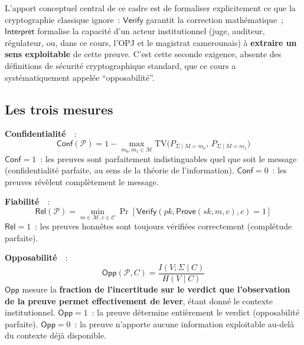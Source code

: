 L'apport conceptuel central de ce cadre est de formaliser
explicitement ce que la cryptographie classique ignore~:
$\mathsf{Verify}$ garantit la correction mathématique~;
$\mathsf{Interpret}$ formalise la capacité d'un acteur institutionnel
(juge, auditeur, régulateur, ou, dans ce cours, l'OPJ et le
magistrat camerounais) à \textbf{extraire un sens exploitable} de
cette preuve. C'est cette seconde exigence, absente des définitions
de sécurité cryptographique standard, que ce cours a systématiquement
appelée ``opposabilité''.

\subsection{Les trois mesures}

\begin{boxdef}
\textbf{Confidentialité}~\cite{minka2026clo}~:
\begin{equation}
\mathsf{Conf}(\mathcal{P}) = 1 - \max_{m_0,m_1 \in \mathcal{M}}
\mathrm{TV}\bigl(P_{\Sigma \mid M=m_0},\, P_{\Sigma \mid M=m_1}\bigr)
\label{eq:conf}
\end{equation}
$\mathsf{Conf} = 1$~: les preuves sont parfaitement indistinguables
quel que soit le message (confidentialité parfaite, au sens de la
théorie de l'information). $\mathsf{Conf} = 0$~: les preuves
révèlent complètement le message.

\textbf{Fiabilité}~\cite{minka2026clo}~:
\begin{equation}
\mathsf{Rel}(\mathcal{P}) = \min_{m \in \mathcal{M}, c \in \mathcal{C}}
\Pr[\mathsf{Verify}(pk, \mathsf{Prove}(sk,m,c), c) = 1]
\label{eq:rel}
\end{equation}
$\mathsf{Rel} = 1$~: les preuves honnêtes sont toujours vérifiées
correctement (complétude parfaite).

\textbf{Opposabilité}~\cite{minka2026clo}~:
\begin{equation}
\mathsf{Opp}(\mathcal{P}, C) = \frac{I(V; \Sigma \mid C)}{H(V \mid C)}
\label{eq:opp}
\end{equation}
$\mathsf{Opp}$ mesure la \textbf{fraction de l'incertitude sur le
verdict que l'observation de la preuve permet effectivement de
lever}, étant donné le contexte institutionnel. $\mathsf{Opp} = 1$~:
la preuve détermine entièrement le verdict (opposabilité parfaite).
$\mathsf{Opp} = 0$~: la preuve n'apporte aucune information
exploitable au-delà du contexte déjà disponible.
\end{boxdef}

